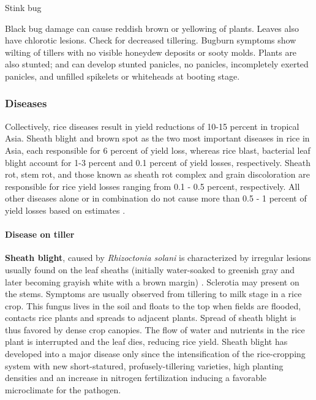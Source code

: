 Stink bug

Black bug damage can cause reddish brown or yellowing of plants. Leaves also have chlorotic lesions. Check for decreased tillering. Bugburn symptoms show wilting of tillers with no visible honeydew deposits or sooty molds. Plants are also stunted; and can develop stunted panicles, no panicles, incompletely exerted panicles, and unfilled spikelets or whiteheads at booting stage.

\subsubsection*{Diseases}


Collectively, rice diseases result in yield reductions of 10-15 percent in tropical Asia. Sheath blight and brown spot as the two most important diseases in rice in Asia, each responsible for 6 percent of yield loss, whereas rice blast, bacterial leaf blight account for 1-3 percent and 0.1 percent of yield losses, respectively. Sheath rot, stem rot, and those known as sheath rot complex and grain discoloration are responsible for rice yield losses ranging from 0.1 - 0.5 percent, respectively. All other diseases alone or in combination do not cause more than 0.5 - 1 percent of yield losses based on estimates \citep{Savary:2000vr, mew2002handbook}.

\paragraph{Disease on tiller} \textbf{Sheath blight}, caused by \textit{Rhizoctonia solani} is characterized by irregular lesions usually found on the leaf sheaths (initially water-soaked to greenish gray and later becoming grayish white with a brown margin) \citep{irrisheathblight}. Sclerotia may present on the stems. Symptoms are usually observed from tillering to milk stage in a rice crop. This fungus lives in the soil and floats to the top when fields are flooded, contacts rice plants and spreads to adjacent plants. Spread of sheath blight is thus favored by dense crop canopies. The flow of water and nutrients in the rice plant is interrupted and the leaf dies, reducing rice yield. Sheath blight has developed into a major disease only since the intensification of the rice-cropping system with new short-statured, profusely-tillering varieties, high planting densities and an increase in nitrogen fertilization inducing a favorable microclimate for the pathogen. 

